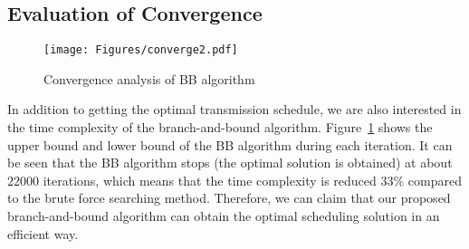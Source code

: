 \subsection{Evaluation of Convergence}
\begin{figure}
\begin{center}
\texttt{[image: Figures/converge2.pdf]}
\caption{\label{fig::evaBBConvergence}Convergence analysis of BB algorithm}
\end{center}
\end{figure}
In addition to getting the optimal transmission schedule, we are also interested in the time complexity of the branch-and-bound algorithm.
Figure~\ref{fig::evaBBConvergence} shows the upper bound and lower bound of the BB algorithm during each iteration.
It can be seen that the BB algorithm stops (the optimal solution is obtained) at about  $22000$ iterations, which means that the time complexity is reduced $33\%$ compared to the brute force searching method.
Therefore, we can claim that our proposed branch-and-bound algorithm can obtain the optimal scheduling solution in an efficient way.
